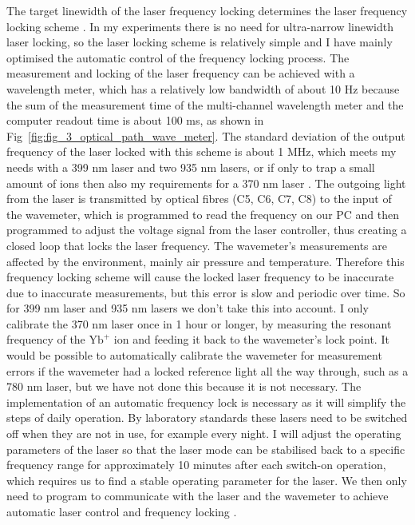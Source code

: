 The target linewidth of the laser frequency locking determines the laser frequency locking scheme \cite{RN137,RN151,RN76}. In my experiments there is no need for ultra-narrow linewidth laser locking, so the laser locking scheme is relatively simple and I have mainly optimised the automatic control of the frequency locking process. The measurement and locking of the laser frequency can be achieved with a wavelength meter, which has a relatively low bandwidth of about 10 Hz because the sum of the measurement time of the multi-channel wavelength meter and the computer readout time is about 100 ms, as shown in Fig~\ref{fig:fig_3_optical_path_wave_meter}. The standard deviation of the output frequency of the laser locked with this scheme is about 1 MHz, which meets my needs with a 399 nm laser and two 935 nm lasers, or if only to trap a small amount of ions then also my requirements for a 370 nm laser \cite{RN78}. The outgoing light from the laser is transmitted by optical fibres (C5, C6, C7, C8) to the input of the wavemeter, which is programmed to read the frequency on our PC and then programmed to adjust the voltage signal from the laser controller, thus creating a closed loop that locks the laser frequency. The wavemeter's measurements are affected by the environment, mainly air pressure and temperature. Therefore this frequency locking scheme will cause the locked laser frequency to be inaccurate due to inaccurate measurements, but this error is slow and periodic over time. So for 399 nm laser and 935 nm lasers we don't take this into account. I only calibrate the 370 nm laser once in 1 hour or longer, by measuring the resonant frequency of the $\mathrm{Yb}^{+}$ ion and feeding it back to the wavemeter's lock point. It would be possible to automatically calibrate the wavemeter for measurement errors if the wavemeter had a locked reference light all the way through, such as a 780 nm laser, but we have not done this because it is not necessary. The implementation of an automatic frequency lock is necessary as it will simplify the steps of daily operation. By laboratory standards these lasers need to be switched off when they are not in use, for example every night. I will adjust the operating parameters of the laser so that the laser mode can be stabilised back to a specific frequency range for approximately 10 minutes after each switch-on operation, which requires us to find a stable operating parameter for the laser. We then only need to program to communicate with the laser and the wavemeter to achieve automatic laser control and frequency locking \cite{RN231}.

